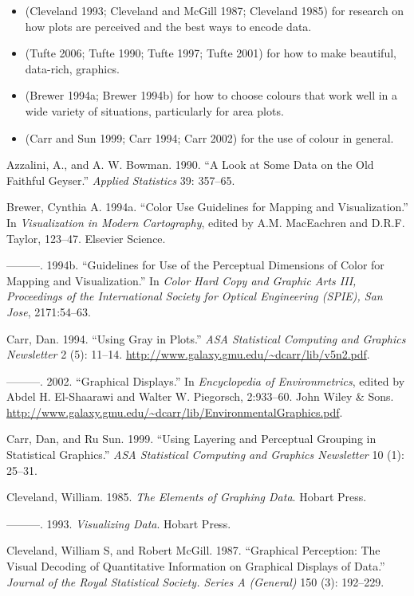 \begin{itemize}
\itemsep1pt\parskip0pt
\item
  (Cleveland 1993; Cleveland and McGill 1987; Cleveland 1985) for
  research on how plots are perceived and the best ways to encode data.
\item
  (Tufte 2006; Tufte 1990; Tufte 1997; Tufte 2001) for how to make
  beautiful, data-rich, graphics.
\item
  (Brewer 1994a; Brewer 1994b) for how to choose colours that work well
  in a wide variety of situations, particularly for area plots.
\item
  (Carr and Sun 1999; Carr 1994; Carr 2002) for the use of colour in
  general.
\end{itemize}

Azzalini, A., and A. W. Bowman. 1990. ``A Look at Some Data on the Old
Faithful Geyser.'' \emph{Applied Statistics} 39: 357--65.

Brewer, Cynthia A. 1994a. ``Color Use Guidelines for Mapping and
Visualization.'' In \emph{Visualization in Modern Cartography}, edited
by A.M. MacEachren and D.R.F. Taylor, 123--47. Elsevier Science.

---------. 1994b. ``Guidelines for Use of the Perceptual Dimensions of
Color for Mapping and Visualization.'' In \emph{Color Hard Copy and
Graphic Arts III, Proceedings of the International Society for Optical
Engineering (SPIE), San Jose}, 2171:54--63.

Carr, Dan. 1994. ``Using Gray in Plots.'' \emph{ASA Statistical
Computing and Graphics Newsletter} 2 (5): 11--14.
\url{http://www.galaxy.gmu.edu/~dcarr/lib/v5n2.pdf}.

---------. 2002. ``Graphical Displays.'' In \emph{Encyclopedia of
Environmetrics}, edited by Abdel H. El-Shaarawi and Walter W. Piegorsch,
2:933--60. John Wiley \& Sons.
\url{http://www.galaxy.gmu.edu/~dcarr/lib/EnvironmentalGraphics.pdf}.

Carr, Dan, and Ru Sun. 1999. ``Using Layering and Perceptual Grouping in
Statistical Graphics.'' \emph{ASA Statistical Computing and Graphics
Newsletter} 10 (1): 25--31.

Cleveland, William. 1985. \emph{The Elements of Graphing Data}. Hobart
Press.

---------. 1993. \emph{Visualizing Data}. Hobart Press.

Cleveland, William S, and Robert McGill. 1987. ``Graphical Perception:
The Visual Decoding of Quantitative Information on Graphical Displays of
Data.'' \emph{Journal of the Royal Statistical Society. Series A
(General)} 150 (3): 192--229.

